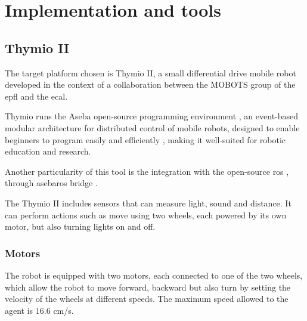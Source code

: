 \chapter{Implementation and tools}
\label{chap:impl}

\section{Thymio II}
\label{sec:thymio}

The target platform chosen is Thymio II, a small differential drive mobile robot 
developed in the context of a collaboration between the MOBOTS group of the 
\gls{epfl} and the \gls{ecal}. 

Thymio runs the Aseba open-source programming environment 
\cite[see][]{magnenat2010aseba}, an event-based modular architecture for 
distributed control of mobile robots, designed to enable beginners to program 
easily and efficiently \cite[][]{mondada2017bringing}, making it well-suited for 
robotic education and research.

Another particularity of this tool is the integration with the open-source 
\gls{ros} \cite[][]{quigley2009ros}, through asebaros bridge \cite[][]{asebaros}. 

The Thymio II includes sensors that can measure light, sound and distance. It can 
perform actions such as move using two wheels, each powered by its own motor, 
but also turning lights on and off.

\subsection{Motors}
\label{subsection: motors}
The robot is equipped with two motors, each connected to one of the two 
wheels, which allow the robot to move forward, backward but also turn by setting 
the velocity of the wheels at different speeds. The maximum speed allowed to the 
agent is $16.6$ \gls{cm/s}.
